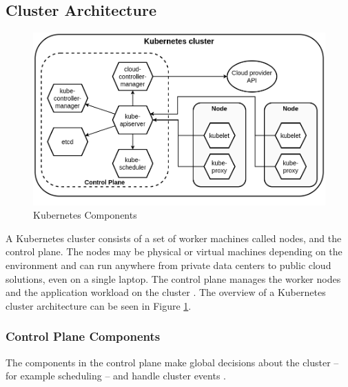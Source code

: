 \subsection{Cluster Architecture}

\begin{figure}[h]
	\centering
	\includegraphics[width=130mm, keepaspectratio]{figures/kubernetes_components.png}
	\caption{Kubernetes Components \cite{KubernetesArchitecture}}
	\label{fig:kubernetes_components}
\end{figure}


A Kubernetes cluster consists of a set of worker machines called nodes, and the control plane. The nodes may be physical or virtual machines depending on the environment and can run anywhere from private data centers to public cloud solutions, even on a single laptop. The control plane manages the worker nodes and the application workload on the cluster \cite{KubernetesArchitecture}. The overview of a Kubernetes cluster architecture can be seen in Figure \ref{fig:kubernetes_components}.

\subsubsection{Control Plane Components} \label{background-kubernetes-control-plane}

The components in the control plane make global decisions about the cluster -- for example scheduling -- and handle cluster events \cite{KubernetesArchitecture}. 

